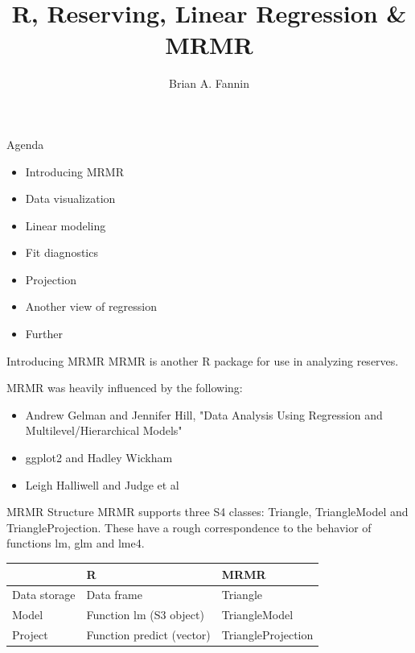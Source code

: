 \documentclass[xcolor=dvipsnames]{beamer}\usepackage{graphicx, color}
\begin{document}
\title{R, Reserving, Linear Regression \& MRMR}
\author{Brian A. Fannin}

\maketitle





\begin{frame} {Agenda}
  \begin{itemize}
    \item Introducing MRMR
    \item Data visualization 
    \item Linear modeling
    \item Fit diagnostics
    \item Projection
    \item Another view of regression
    \item Further
  \end{itemize}
\end{frame}

\begin{frame} {Introducing MRMR}
  MRMR is another R package for use in analyzing reserves.
  
  MRMR was heavily influenced by the following:
  \begin{itemize}
    \item Andrew Gelman and Jennifer Hill, "Data Analysis Using Regression and Multilevel/Hierarchical Models"
    \item ggplot2 and Hadley Wickham
    \item Leigh Halliwell and Judge et al
  \end{itemize}
\end{frame}

\begin{frame} {MRMR Structure}
  MRMR supports three S4 classes: Triangle, TriangleModel and TriangleProjection. These have a rough correspondence to the behavior of functions lm, glm and lme4.
  
  \begin{tabular} { | l | l | l | }
    \hline
     & R & MRMR \\ \hline
    Data storage & Data frame & Triangle \\ \hline
    Model & Function lm (S3 object) & TriangleModel \\ \hline
    Project & Function predict (vector) & TriangleProjection \\ 
    \hline
  \end{tabular}
\end{frame}
\end{document}
